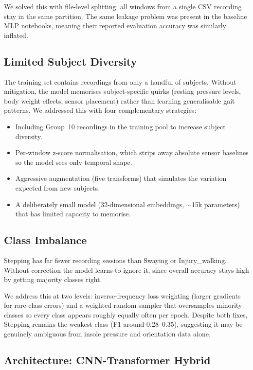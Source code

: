 \documentclass[11pt,a4paper,twocolumn]{article}
\begin{document}
We solved this with file-level splitting: all windows from a single CSV recording stay in the same partition. The same leakage problem was present in the baseline MLP notebooks, meaning their reported evaluation accuracy was similarly inflated.

\subsection{Limited Subject Diversity}

The training set contains recordings from only a handful of subjects. Without mitigation, the model memorises subject-specific quirks (resting pressure levels, body weight effects, sensor placement) rather than learning generalisable gait patterns. We addressed this with four complementary strategies:
\begin{itemize}
\item Including Group~10 recordings in the training pool to increase subject diversity.
\item Per-window z-score normalisation, which strips away absolute sensor baselines so the model sees only temporal shape.
\item Aggressive augmentation (five transforms) that simulates the variation expected from new subjects.
\item A deliberately small model (32-dimensional embeddings, ${\sim}$15k parameters) that has limited capacity to memorise.
\end{itemize}

\subsection{Class Imbalance}

Stepping has far fewer recording sessions than Swaying or Injury\_walking. Without correction the model learns to ignore it, since overall accuracy stays high by getting majority classes right.

We address this at two levels: inverse-frequency loss weighting (larger gradients for rare-class errors) and a weighted random sampler that oversamples minority classes so every class appears roughly equally often per epoch. Despite both fixes, Stepping remains the weakest class (F1 around 0.28--0.35), suggesting it may be genuinely ambiguous from insole pressure and orientation data alone.

\subsection{Architecture: CNN-Transformer Hybrid}
\end{document}
